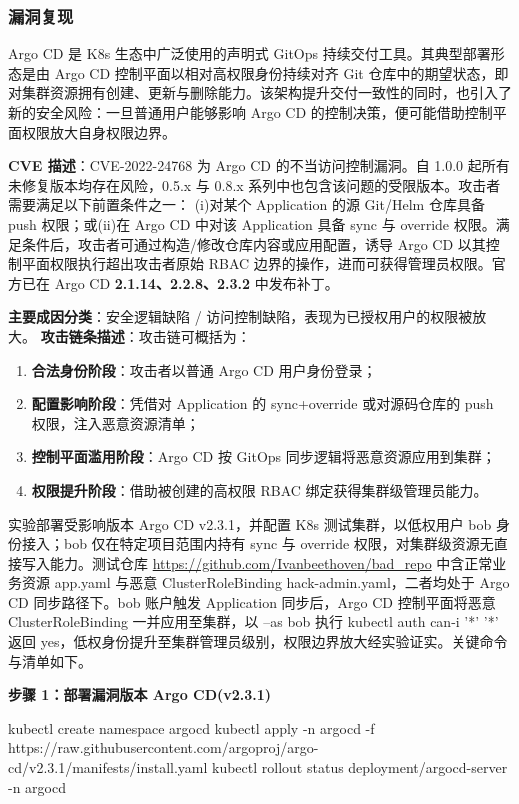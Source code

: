 
\subsubsection{漏洞复现}

Argo CD 是 K8s 生态中广泛使用的声明式 GitOps 持续交付工具。其典型部署形态是由 Argo CD 控制平面以相对高权限身份持续对齐 Git 仓库中的期望状态，即对集群资源拥有创建、更新与删除能力。该架构提升交付一致性的同时，也引入了新的安全风险：一旦普通用户能够影响 Argo CD 的控制决策，便可能借助控制平面权限放大自身权限边界。

  \textbf{CVE 描述}：CVE-2022-24768 为 Argo CD 的不当访问控制漏洞。自 1.0.0 起所有未修复版本均存在风险，0.5.x 与 0.8.x 系列中也包含该问题的受限版本。攻击者需要满足以下前置条件之一：
(i)对某个 Application 的源 Git/Helm 仓库具备 push 权限；或(ii)在 Argo CD 中对该 Application 具备 sync 与 override 权限。满足条件后，攻击者可通过构造/修改仓库内容或应用配置，诱导 Argo CD 以其控制平面权限执行超出攻击者原始 RBAC 边界的操作，进而可获得管理员权限。官方已在 Argo CD \textbf{2.1.14、2.2.8、2.3.2} 中发布补丁。

  \textbf{主要成因分类}：安全逻辑缺陷 / 访问控制缺陷，表现为已授权用户的权限被放大。
  \textbf{攻击链条描述}：攻击链可概括为：
\begin{enumerate}
    \item \textbf{合法身份阶段}：攻击者以普通 Argo CD 用户身份登录；
    \item \textbf{配置影响阶段}：凭借对 Application 的 sync\allowbreak+\allowbreak override 或对源码仓库的 push 权限，注入恶意资源清单；
    \item \textbf{控制平面滥用阶段}：Argo CD 按 GitOps 同步逻辑将恶意资源应用到集群；
    \item \textbf{权限提升阶段}：借助被创建的高权限 RBAC 绑定获得集群级管理员能力。
\end{enumerate}


实验部署受影响版本 Argo CD v2.3.1，并配置 K8s 测试集群，以低权用户 bob 身份接入；bob 仅在特定项目范围内持有 sync 与 override 权限，对集群级资源无直接写入能力。测试仓库 \url{https://github.com/Ivanbeethoven/bad_repo} 中含正常业务资源 app.yaml 与恶意 ClusterRoleBinding hack-admin.yaml，二者均处于 Argo CD 同步路径下。bob 账户触发 Application 同步后，Argo CD 控制平面将恶意 ClusterRoleBinding 一并应用至集群，以 --as bob 执行 kubectl auth can-i '*' '*' 返回 yes，低权身份提升至集群管理员级别，权限边界放大经实验证实。关键命令与清单如下。

  \textbf{步骤 1：部署漏洞版本 Argo CD(v2.3.1)}
\begin{AppendixCode}
kubectl create namespace argocd
kubectl apply -n argocd -f https://raw.githubusercontent.com/argoproj/argo-cd/v2.3.1/manifests/install.yaml
kubectl rollout status deployment/argocd-server -n argocd
\end{AppendixCode}


